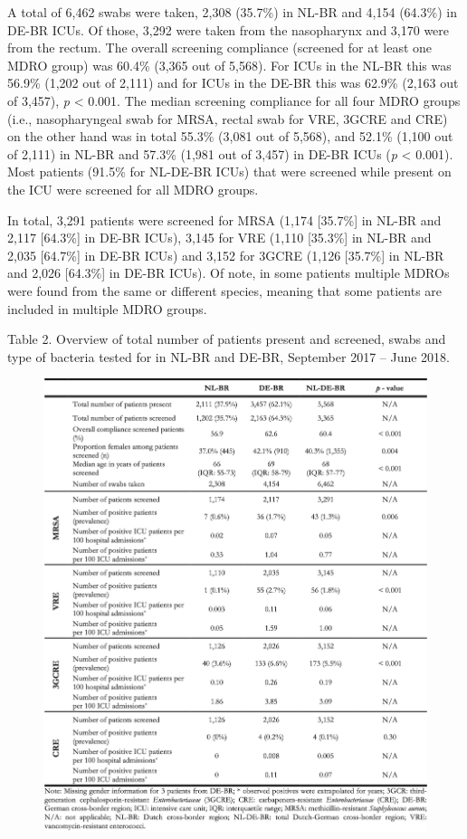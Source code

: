 \documentclass[
]{book}
\begin{document}
A total of 6,462 swabs were taken, 2,308 (35.7\%) in NL-BR and 4,154 (64.3\%) in DE-BR ICUs. Of those, 3,292 were taken from the nasopharynx and 3,170 were from the rectum. The overall screening compliance (screened for at least one MDRO group) was 60.4\% (3,365 out of 5,568). For ICUs in the NL-BR this was 56.9\% (1,202 out of 2,111) and for ICUs in the DE-BR this was 62.9\% (2,163 out of 3,457), \emph{p} \textless{} 0.001. The median screening compliance for all four MDRO groups (i.e., nasopharyngeal swab for MRSA, rectal swab for VRE, 3GCRE and CRE) on the other hand was in total 55.3\% (3,081 out of 5,568), and 52.1\% (1,100 out of 2,111) in NL-BR and 57.3\% (1,981 out of 3,457) in DE-BR ICUs (\emph{p} \textless{} 0.001). Most patients (91.5\% for NL-DE-BR ICUs) that were screened while present on the ICU were screened for all MDRO groups.

In total, 3,291 patients were screened for MRSA (1,174 {[}35.7\%{]} in NL-BR and 2,117 {[}64.3\%{]} in DE-BR ICUs), 3,145 for VRE (1,110 {[}35.3\%{]} in NL-BR and 2,035 {[}64.7\%{]} in DE-BR ICUs) and 3,152 for 3GCRE (1,126 {[}35.7\%{]} in NL-BR and 2,026 {[}64.3\%{]} in DE-BR ICUs). Of note, in some patients multiple MDROs were found from the same or different species, meaning that some patients are included in multiple MDRO groups.

Table 2. Overview of total number of patients present and screened, swabs and type of bacteria tested for in NL-BR and DE-BR, September 2017 -- June 2018.

\begin{figure}

{\centering \includegraphics[width=1\linewidth]{images/10-t02} 

}

\end{figure}
\end{document}
